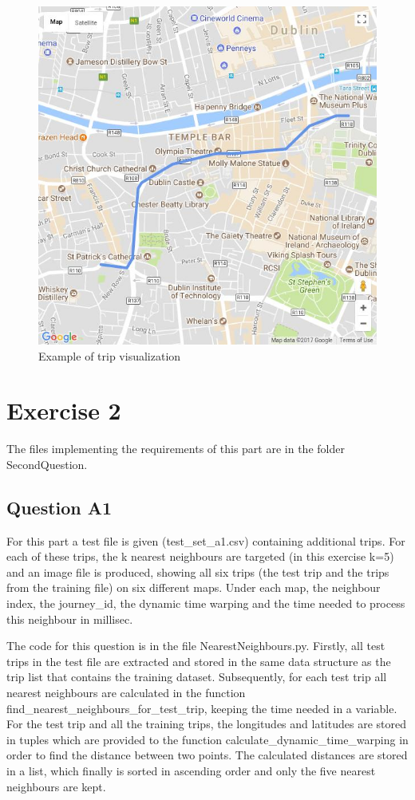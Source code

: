 \documentclass[12pt]{article}
\begin{document}
	\begin{figure} [H]
		\begin{center}
			\includegraphics [scale = 0.75] {questionCexample.jpg}
			\caption{Example of trip visualization}
		\end{center}
	\end{figure} 
	
	\section{Exercise 2}
	The files implementing the requirements of this part are in the folder SecondQuestion.
	
	\subsection{Question A1}
	For this part a test file is given (test\_set\_a1.csv) containing additional trips. For each of these trips, the k nearest neighbours are targeted (in this exercise k=5) and an image file is produced, showing all six trips (the test trip and the trips from the training file) on six different maps. Under each map, the neighbour index, the journey\_id, the dynamic time warping and the time needed to process this neighbour in millisec.
	
	The code for this question is in the file NearestNeighbours.py. Firstly, all test trips in the test file are extracted and stored in the same data structure as the trip list that contains the training dataset. Subsequently, for each test trip all nearest neighbours are calculated in the function find\_nearest\_neighbours\_for\_test\_trip, keeping the time needed in a variable. For the test trip and all the training trips, the longitudes and latitudes are stored in tuples which are provided to the function calculate\_dynamic\_time\_warping in order to find the distance between two points. The calculated distances are stored in a list, which finally is sorted in ascending order and only the five nearest neighbours are kept.
	
\end{document}
